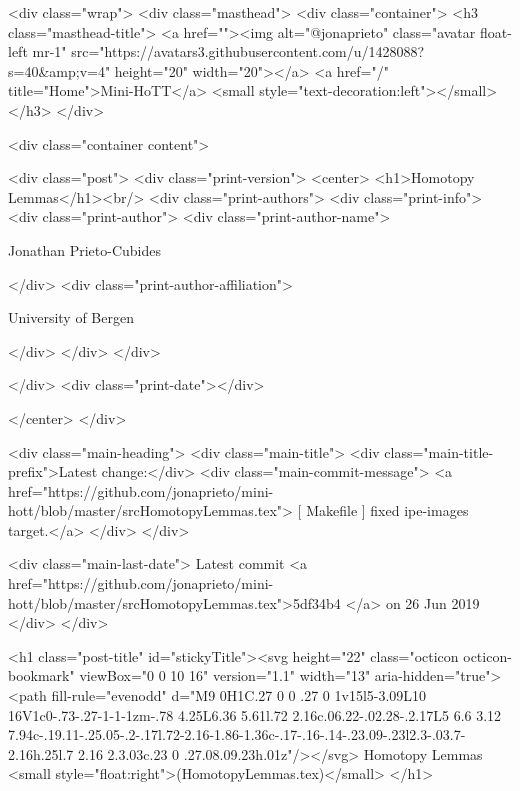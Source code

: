     <div class="wrap">
      <div class="masthead">
        <div class="container">
          <h3 class="masthead-title">
            <a href=""><img alt="@jonaprieto" class="avatar float-left mr-1" src="https://avatars3.githubusercontent.com/u/1428088?s=40&amp;v=4" height="20" width="20"></a>
            <a href="/" title="Home">Mini-HoTT</a>
            <small style="text-decoration:left"></small>
          </h3>
        </div>
      
      <div class="container content">
        







<div class="post">
  <div class="print-version">
    <center>
      <h1>Homotopy Lemmas</h1><br/>
        <div class="print-authors">
          <div class="print-info">
            <div class="print-author">
              <div class="print-author-name">
                
                  Jonathan Prieto-Cubides
                
              </div>
              <div class="print-author-affiliation">
                
                  University of Bergen
                
                </div>
            </div>
          </div>
          
          
        </div>
        <div class="print-date"></div>
        
        
    </center>
  </div>

  
  <div class="main-heading">
    <div class="main-title">
      <div class="main-title-prefix">Latest change:</div>
      <div class="main-commit-message">
            <a href="https://github.com/jonaprieto/mini-hott/blob/master/srcHomotopyLemmas.tex">
              [ Makefile ] fixed ipe-images target.</a>
      </div>
    </div>

    <div class="main-last-date">
      Latest commit <a href="https://github.com/jonaprieto/mini-hott/blob/master/srcHomotopyLemmas.tex">5df34b4 </a> on  26 Jun 2019
    </div>
  </div>
  

  <h1 class="post-title" id="stickyTitle"><svg height="22" class="octicon octicon-bookmark" viewBox="0 0 10 16" version="1.1" width="13" aria-hidden="true"><path fill-rule="evenodd" d="M9 0H1C.27 0 0 .27 0 1v15l5-3.09L10 16V1c0-.73-.27-1-1-1zm-.78 4.25L6.36 5.61l.72 2.16c.06.22-.02.28-.2.17L5 6.6 3.12 7.94c-.19.11-.25.05-.2-.17l.72-2.16-1.86-1.36c-.17-.16-.14-.23.09-.23l2.3-.03.7-2.16h.25l.7 2.16 2.3.03c.23 0 .27.08.09.23h.01z"/></svg> Homotopy Lemmas <small style="float:right">(HomotopyLemmas.tex)</small>
  </h1>

